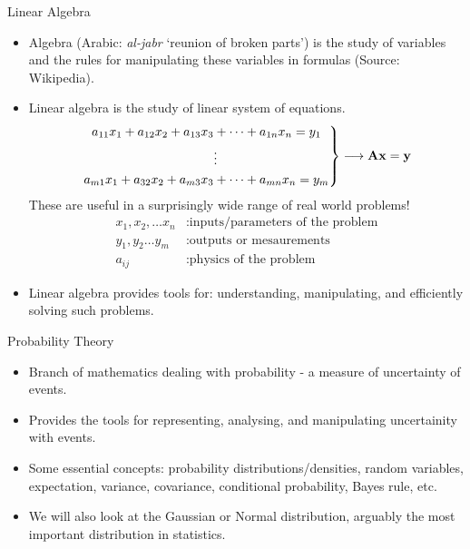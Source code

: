 \documentclass[aspectratio=169]{beamer}
\let\olditem\item
\renewcommand{\item}{\setlength{\itemsep}{\fill}\olditem}
\def\mf{\ensuremath\mathbf}
\begin{document}
\begin{frame}[t]{Linear Algebra}
  \begin{itemize}
    \item Algebra (Arabic: \textit{al-jabr} `reunion of broken parts') is the study of variables and the rules for manipulating these variables in formulas (Source: Wikipedia).
    
    \item Linear algebra is the study of linear system of equations.
    \[
      \left. \begin{aligned}
        a_{11} x_1 + a_{12} x_2 + a_{13} x_3 &+ \cdots + a_{1n} x_n = y_1\\
        &\vdots \\ 
        a_{m1} x_1 + a_{32} x_2 + a_{m3} x_3 &+ \cdots + a_{mn} x_n = y_m
      \end{aligned} \right\} \longrightarrow \mf{A}\mf{x} = \mf{y}
    \]
    These are useful in a surprisingly wide range of real world problems!
    \[ 
      \begin{split}
        x_1, x_2, \ldots x_n &: \text{inputs/parameters of the problem}\\
        y_1, y_2 \ldots y_m &: \text{outputs or mesaurements}\\
        a_{ij} &: \text{physics of the problem}
      \end{split}
    \]
    \item Linear algebra provides tools for: understanding, manipulating, and efficiently solving such problems.
  \end{itemize}
\end{frame}


\begin{frame}{Probability Theory}
  \begin{itemize}
    \item Branch of mathematics dealing with probability - a measure of uncertainty of events.
    
    \item Provides the tools for representing, analysing, and manipulating uncertainity with events.
    
    \item Some essential concepts: probability distributions/densities, random variables, expectation, variance, covariance, conditional probability, Bayes rule, etc.
    
    \item We will also look at the Gaussian or Normal distribution, arguably the most important distribution in statistics.
  \end{itemize}
\end{frame}
\end{document}
